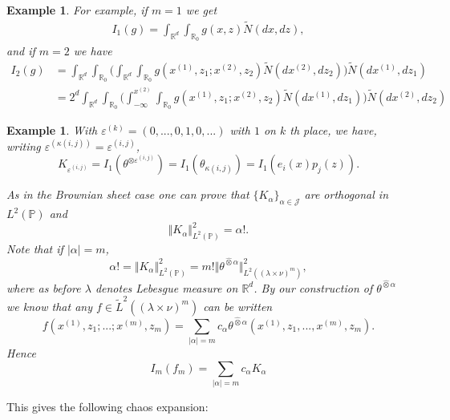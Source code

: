 \documentclass[12pt]{article}%
\newtheorem{example}[theorem]{Example}
\numberwithin{equation}{section}
\def\P{\mathbb{P}}
\def\R{\mathbb{R}}
\begin{document}
\begin{example}
    For example, if $m=1$ we get
    \begin{align}
        I_1(g)=\int_{\R^d} \int_{\R_0} g(x,z) \widetilde{N}(dx,dz),
    \end{align}
    and if $m=2$ we have
    \begin{align}
        I_2(g)&=\int_{\R^d} \int_{\R_0} \Big( \int_{\R^d} \int_{\R_0} g(x^{(1)},z_1; x^{(2)},z_2) \widetilde{N}(dx^{(2)},dz_2) \Big)\widetilde{N}(dx^{(1)},dz_1)\nonumber\\
        &=2^d\int_{\R^d}\int_{\R_0} \Big(\int_{-\infty}^{x^{(2)}} \int_{\R_0} g(x^{(1)},z_1; x^{(2)},z_2) \widetilde{N}(dx^{(1)},dz_1)\Big) \widetilde{N}(dx^{(2)},dz_2)
    \end{align}
\end{example}
\begin{example}
\label{Ex10.1}
With $\varepsilon ^{(k)}=(0,...,0,1,0,...)$ with $1$ on $k$ th
place, we have, writing $\varepsilon ^{(\kappa (i,j))}=\varepsilon ^{(i,j)}$,
\begin{equation}
K_{\varepsilon ^{(i,j)}}
= I_1(\theta^{\otimes \varepsilon^{(i,j)}})
=I_{1}\left( \theta_{\kappa (i,j)} \right)
=I_{1}\left( e _{i}(x)p_{j}(z)\right) .  \label{10.11}
\end{equation}%

As in the Brownian sheet case one can prove that $\{ K_\alpha  \}_{\alpha \in \mathcal{J}}$ are
orthogonal in $L^2(\P)$ and
\[
\Vert K_\alpha \Vert^2_{L^2(\P)} = \alpha!.
\]
Note that if $|\alpha|=m$,
\[
\alpha ! =\Vert K_\alpha \Vert^2_{L^2(\P)} = m! \Vert \theta^{\hat\otimes \alpha} \Vert^2_{L^2((\lambda\times\nu)^m)},
\]
where as before $\lambda$ denotes Lebesgue measure on $\R^d$.
By our construction of $\theta ^{\hat{\otimes }\alpha }$ we know that
any $f\in \widetilde{L}^{2}((\lambda \times \nu )^{m})$ can be written%
\begin{equation}
f(x^{(1)},z_{1};...; x^{(m)},z_{m})=\sum_{\left\vert \alpha \right\vert
=m}c_{\alpha }\theta ^{\hat{\otimes }\alpha
}(x^{(1)},z_{1},..., x^{(m)},z_{m}).
\end{equation}
Hence
\begin{equation}
I_{m}(f_{m})=\sum_{\left\vert \alpha \right\vert =m}c_{\alpha }K_{\alpha }
\end{equation}
\end{example}
This gives the following chaos expansion:
\end{document}
